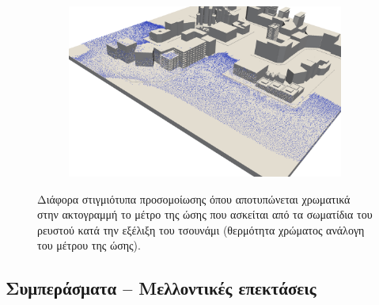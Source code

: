 \begin{figure}[h]
\begin{subfigure}{.5\textwidth}
  \end{subfigure}
  \begin{subfigure}{.5\textwidth}
    \centering
    \includegraphics[width=\textwidth]{figures/impulses-3.png}
  \end{subfigure}
  \caption[Ώσεις στην ακτογραμμή]{Διάφορα στιγμιότυπα προσομοίωσης όπου αποτυπώνεται
    χρωματικά στην ακτογραμμή το μέτρο της ώσης που ασκείται από τα σωματίδια του ρευστού
    κατά την εξέλιξη του τσουνάμι (θερμότητα χρώματος ανάλογη του μέτρου της ώσης).}
  \label{fig:impulses}
\end{figure}

\subsection{Συμπεράσματα -- Μελλοντικές επεκτάσεις}
\paragraph{} 


